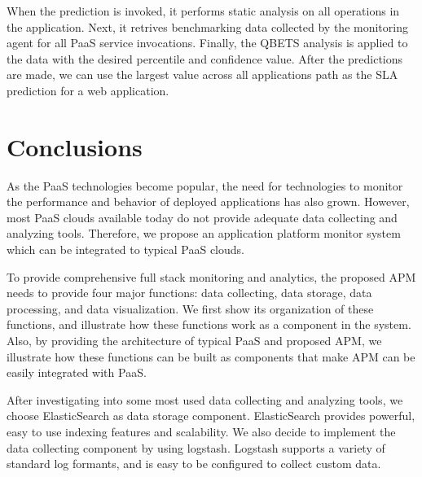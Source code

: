 \documentclass[11pt]{article}
\begin{document}
When the prediction is invoked, it performs static analysis on all operations in the application. Next, it retrives benchmarking data collected by
the monitoring agent for all PaaS service invocations. Finally, the QBETS analysis is applied to the data with the desired percentile and confidence value.
After the predictions are made, we can use the largest value across all applications path as the SLA prediction for a web application.

\section{Conclusions}
As the PaaS technologies become popular, the need for technologies to monitor the performance and behavior of
deployed applications has also grown. However, most PaaS clouds available today do not provide adequate
data collecting and analyzing tools. Therefore, we propose an application platform monitor system which can be
integrated to typical PaaS clouds.

To provide comprehensive full stack monitoring and analytics, the proposed APM needs to provide four major functions:
data collecting, data storage, data processing, and data visualization. We first show its organization of
these functions, and illustrate how these functions work as a component in the system. Also, by providing the
architecture of typical PaaS and proposed APM, we illustrate how these functions can be built as components that
make APM can be easily integrated with PaaS.

After investigating into some most used data collecting and analyzing tools, we choose ElasticSearch as data storage
component. ElasticSearch provides powerful, easy to use indexing features and scalability. We also decide to
implement the data collecting component by using logstash. Logstash supports a variety of standard log formants,
and is easy to be configured to collect custom data.
\end{document}
